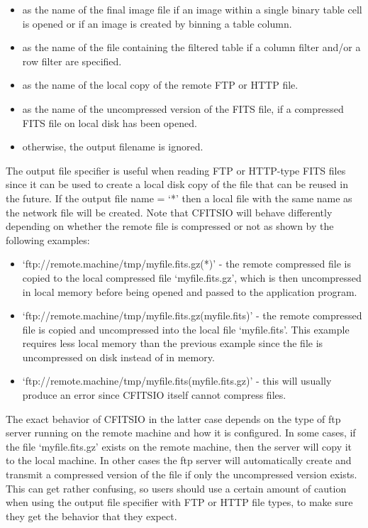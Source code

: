 \documentclass[11pt]{book}
\begin{document}
\begin{itemize}
\item
as the name of the final image file if an image within a single binary
table cell is opened or if an image is created by binning a table column.
\item
as the name of the file containing the filtered table if a column filter
and/or a row filter are specified.
\item
as the name of the local copy of the remote FTP or HTTP file.
\item
as the name of the uncompressed version of the FITS file, if a
compressed FITS file on local disk has been opened.
\item
otherwise, the output filename is ignored.
\end{itemize}


The output file specifier is useful when reading FTP or HTTP-type
FITS files since it can be used to create a local disk copy of the file
that can be reused in the future.  If the output file name = `*' then a
local file with the same name as the network file will be created.
Note that CFITSIO will behave differently depending on whether the
remote file is compressed or not as shown by the following examples:
\begin{itemize}
\item
`ftp://remote.machine/tmp/myfile.fits.gz(*)' - the remote compressed
file is copied to the local compressed file `myfile.fits.gz', which
is then uncompressed in local memory before being opened and passed
to the application program.

\item
`ftp://remote.machine/tmp/myfile.fits.gz(myfile.fits)' - the remote
compressed file is copied and uncompressed into the local file
`myfile.fits'.  This example requires less local memory than the
previous example since the file is uncompressed on disk instead of
in memory.

\item
`ftp://remote.machine/tmp/myfile.fits(myfile.fits.gz)' - this will
usually produce an error since CFITSIO itself cannot compress files.
\end{itemize}

The exact behavior of CFITSIO in the latter case depends on the type of
ftp server running on the remote machine and how it is configured.  In
some cases, if the file `myfile.fits.gz' exists on the remote machine,
then the server will copy it to the local machine.  In other cases the
ftp server will automatically create and transmit a compressed version
of the file if only the uncompressed version exists.  This can get
rather confusing, so users should use a certain amount of caution when
using the output file specifier with FTP or HTTP file types, to make
sure they get the behavior that they expect.
\end{document}
